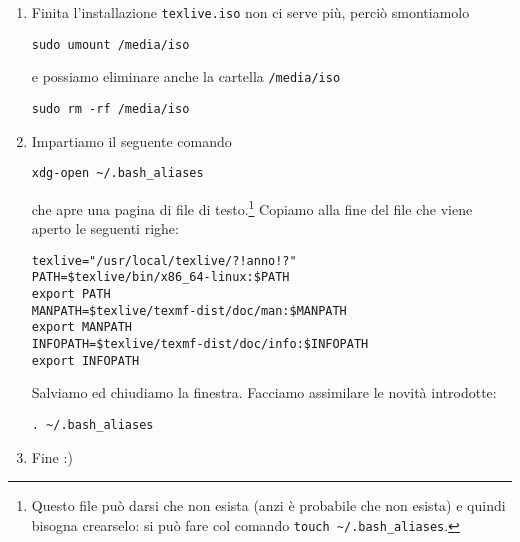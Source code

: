\begin{enumerate}
\item Finita l'installazione \lstinline£texlive.iso£ non ci serve più, perciò smontiamolo
\begin{lstlisting}
sudo umount /media/iso
\end{lstlisting}
e possiamo eliminare anche la cartella \lstinline£/media/iso£
\begin{lstlisting}
sudo rm -rf /media/iso
\end{lstlisting}

\item Impartiamo il seguente comando
\begin{lstlisting}
xdg-open ~/.bash_aliases
\end{lstlisting}
che apre una pagina di file di testo.\footnote{Questo file può darsi che non esista (anzi è probabile che non esista) e quindi bisogna crearselo: si può fare col comando \lstinline£touch ~/.bash_aliases£.} Copiamo alla fine del file che viene aperto le seguenti righe:
\begin{lstlisting}
texlive="/usr/local/texlive/?!anno!?"
PATH=$texlive/bin/x86_64-linux:$PATH
export PATH
MANPATH=$texlive/texmf-dist/doc/man:$MANPATH
export MANPATH
INFOPATH=$texlive/texmf-dist/doc/info:$INFOPATH
export INFOPATH
\end{lstlisting}
Salviamo ed chiudiamo la finestra. Facciamo assimilare le novità introdotte:
\begin{lstlisting}
. ~/.bash_aliases
\end{lstlisting}

\item Fine :)
\end{enumerate}
